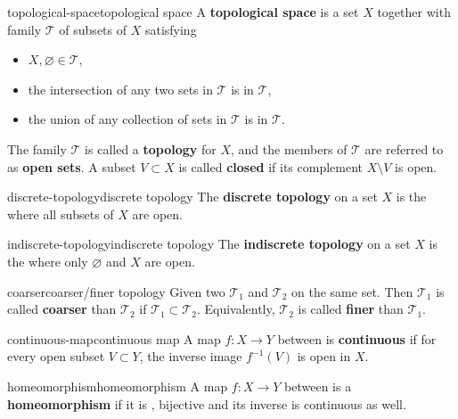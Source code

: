 \begin{topic}{topological-space}{topological space}
    A \textbf{topological space} is a set $X$ together with family $\mathcal{T}$ of subsets of $X$ satisfying
    \begin{itemize}
        \item $X, \varnothing \in \mathcal{T}$,
        \item the intersection of any two sets in $\mathcal{T}$ is in $\mathcal{T}$,
        \item the union of any collection of sets in $\mathcal{T}$ is in $\mathcal{T}$.
    \end{itemize}
    The family $\mathcal{T}$ is called a \textbf{topology} for $X$, and the members of $\mathcal{T}$ are referred to as \textbf{open sets}. A subset $V \subset X$ is called \textbf{closed} if its complement $X \setminus V$ is open.
\end{topic}

\begin{topic}{discrete-topology}{discrete topology}
    The \textbf{discrete topology} on a set $X$ is the  where all subsets of $X$ are open.
\end{topic}

\begin{topic}{indiscrete-topology}{indiscrete topology}
    The \textbf{indiscrete topology} on a set $X$ is the  where only $\varnothing$ and $X$ are open.
\end{topic}

\begin{topic}{coarser}{coarser/finer topology}
    Given two  $\mathcal{T}_1$ and $\mathcal{T}_2$ on the same set. Then $\mathcal{T}_1$ is called \textbf{coarser} than $\mathcal{T}_2$ if $\mathcal{T}_1 \subset \mathcal{T}_2$. Equivalently, $\mathcal{T}_2$ is called \textbf{finer} than $\mathcal{T}_1$.
\end{topic}

\begin{topic}{continuous-map}{continuous map}
    A map $f : X \to Y$ between  is \textbf{continuous} if for every open subset $V \subset Y$, the inverse image $f^{-1}(V)$ is open in $X$.
\end{topic}

\begin{topic}{homeomorphism}{homeomorphism}
    A map $f : X \to Y$ between  is a \textbf{homeomorphism} if it is , bijective and its inverse is continuous as well.
\end{topic}

